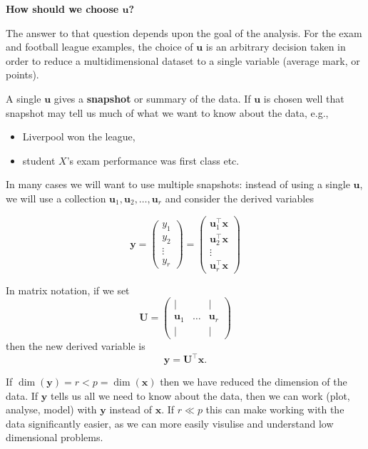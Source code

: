 \documentclass[]{book}
\providecommand{\tightlist}{%
  \setlength{\itemsep}{0pt}\setlength{\parskip}{0pt}}
\theoremstyle{definition}
\theoremstyle{definition}
\theoremstyle{definition}
\theoremstyle{remark}
\begin{document}
\textbf{How should we choose \(\mathbf u\)?}

The answer to that question depends upon the goal of the analysis. For the exam and football league examples, the choice of \(\mathbf u\) is an arbitrary decision taken in order to reduce a multidimensional dataset to a single variable (average mark, or points).

A single \(\mathbf u\) gives a \textbf{snapshot} or summary of the data. If \(\mathbf u\) is chosen well that snapshot may tell us much of what we want to know about the data, e.g.,

\begin{itemize}
\tightlist
\item
  Liverpool won the league,
\item
  student \(X\)'s exam performance was first class etc.
\end{itemize}

In many cases we will want to use multiple snapshots: instead of using a single \(\mathbf u\), we will use a collection \(\mathbf u_1, \mathbf u_2, \ldots, \mathbf u_r\) and consider the derived variables

\[\mathbf y= \begin{pmatrix} y_1\\y_2 \\ \vdots \\ y_r\end{pmatrix} = \begin{pmatrix}
\mathbf u_1^\top \mathbf x\\  \mathbf u_2^\top \mathbf x\\\vdots\\  \mathbf u_r^\top \mathbf x\end{pmatrix}\]

In matrix notation, if we set
\[\mathbf U= \begin{pmatrix} 
|&&|\\
\mathbf u_1 & \ldots & \mathbf u_r\\
|&&|\end{pmatrix}\]
then the new derived variable is
\[\mathbf y= \mathbf U^\top \mathbf x.\]

If \(\dim(\mathbf y)=r<p=\dim(\mathbf x)\) then we have reduced the dimension of the data. If \(\mathbf y\) tells us all we need to know about the data, then we can work (plot, analyse, model) with \(\mathbf y\) instead of \(\mathbf x\). If \(r\ll p\) this can make working with the data significantly easier, as we can more easily visulise and understand low dimensional problems.
\end{document}
